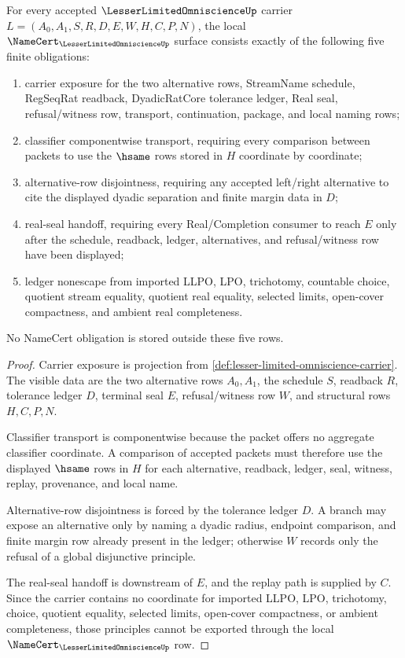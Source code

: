 \begin{theorem}
\label{thm:lesser-limited-omniscience-namecert-obligations}
For every accepted $\LesserLimitedOmniscienceUp$ carrier $L=(A_0,A_1,S,R,D,E,W,H,C,P,N)$, the local $\NameCert_{\LesserLimitedOmniscienceUp}$ surface consists exactly of the following five finite obligations:
\begin{enumerate}
\item carrier exposure for the two alternative rows, StreamName schedule, RegSeqRat readback, DyadicRatCore tolerance ledger, Real seal, refusal/witness row, transport, continuation, package, and local naming rows;
\item classifier componentwise transport, requiring every comparison between packets to use the $\hsame$ rows stored in $H$ coordinate by coordinate;
\item alternative-row disjointness, requiring any accepted left/right alternative to cite the displayed dyadic separation and finite margin data in $D$;
\item real-seal handoff, requiring every Real/Completion consumer to reach $E$ only after the schedule, readback, ledger, alternatives, and refusal/witness row have been displayed;
\item ledger nonescape from imported LLPO, LPO, trichotomy, countable choice, quotient stream equality, quotient real equality, selected limits, open-cover compactness, and ambient real completeness.
\end{enumerate}
No NameCert obligation is stored outside these five rows.
\end{theorem}
\begin{proof}
Carrier exposure is projection from \autoref{def:lesser-limited-omniscience-carrier}. The visible data are the two alternative rows $A_0,A_1$, the schedule $S$, readback $R$, tolerance ledger $D$, terminal seal $E$, refusal/witness row $W$, and structural rows $H,C,P,N$.

Classifier transport is componentwise because the packet offers no aggregate classifier coordinate. A comparison of accepted packets must therefore use the displayed $\hsame$ rows in $H$ for each alternative, readback, ledger, seal, witness, replay, provenance, and local name.

Alternative-row disjointness is forced by the tolerance ledger $D$. A branch may expose an alternative only by naming a dyadic radius, endpoint comparison, and finite margin row already present in the ledger; otherwise $W$ records only the refusal of a global disjunctive principle.

The real-seal handoff is downstream of $E$, and the replay path is supplied by $C$. Since the carrier contains no coordinate for imported LLPO, LPO, trichotomy, choice, quotient equality, selected limits, open-cover compactness, or ambient completeness, those principles cannot be exported through the local $\NameCert_{\LesserLimitedOmniscienceUp}$ row.
\end{proof}

